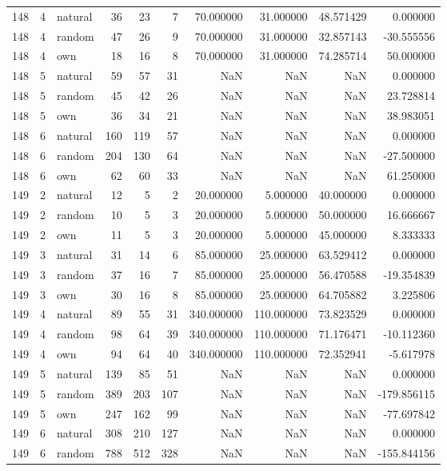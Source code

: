 \begin{table}[htbp]
\begin{tabular}{rrlrrrrrrr}
148 & 4 & natural & 36 & 23 & 7 & 70.000000 & 31.000000 & 48.571429 & 0.000000 \\
148 & 4 & random & 47 & 26 & 9 & 70.000000 & 31.000000 & 32.857143 & -30.555556 \\
148 & 4 & own & 18 & 16 & 8 & 70.000000 & 31.000000 & 74.285714 & 50.000000 \\
148 & 5 & natural & 59 & 57 & 31 & NaN & NaN & NaN & 0.000000 \\
148 & 5 & random & 45 & 42 & 26 & NaN & NaN & NaN & 23.728814 \\
148 & 5 & own & 36 & 34 & 21 & NaN & NaN & NaN & 38.983051 \\
148 & 6 & natural & 160 & 119 & 57 & NaN & NaN & NaN & 0.000000 \\
148 & 6 & random & 204 & 130 & 64 & NaN & NaN & NaN & -27.500000 \\
148 & 6 & own & 62 & 60 & 33 & NaN & NaN & NaN & 61.250000 \\
149 & 2 & natural & 12 & 5 & 2 & 20.000000 & 5.000000 & 40.000000 & 0.000000 \\
149 & 2 & random & 10 & 5 & 3 & 20.000000 & 5.000000 & 50.000000 & 16.666667 \\
149 & 2 & own & 11 & 5 & 3 & 20.000000 & 5.000000 & 45.000000 & 8.333333 \\
149 & 3 & natural & 31 & 14 & 6 & 85.000000 & 25.000000 & 63.529412 & 0.000000 \\
149 & 3 & random & 37 & 16 & 7 & 85.000000 & 25.000000 & 56.470588 & -19.354839 \\
149 & 3 & own & 30 & 16 & 8 & 85.000000 & 25.000000 & 64.705882 & 3.225806 \\
149 & 4 & natural & 89 & 55 & 31 & 340.000000 & 110.000000 & 73.823529 & 0.000000 \\
149 & 4 & random & 98 & 64 & 39 & 340.000000 & 110.000000 & 71.176471 & -10.112360 \\
149 & 4 & own & 94 & 64 & 40 & 340.000000 & 110.000000 & 72.352941 & -5.617978 \\
149 & 5 & natural & 139 & 85 & 51 & NaN & NaN & NaN & 0.000000 \\
149 & 5 & random & 389 & 203 & 107 & NaN & NaN & NaN & -179.856115 \\
149 & 5 & own & 247 & 162 & 99 & NaN & NaN & NaN & -77.697842 \\
149 & 6 & natural & 308 & 210 & 127 & NaN & NaN & NaN & 0.000000 \\
149 & 6 & random & 788 & 512 & 328 & NaN & NaN & NaN & -155.844156 \\

\end{tabular}
\end{table}
